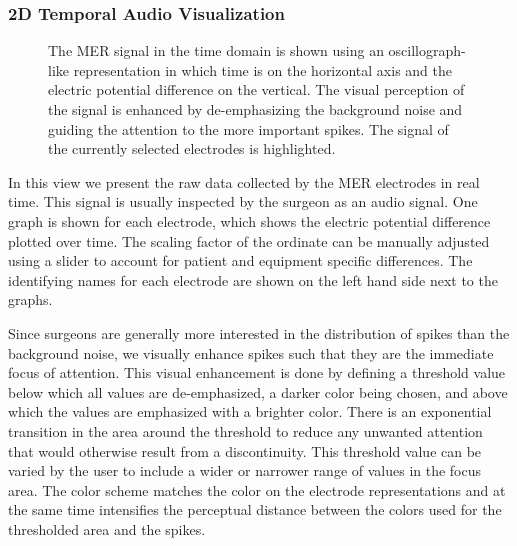 \documentclass{vgtc}                          %
\begin{document}
\subsubsection{2D Temporal Audio Visualization}\label{sec:overview:recording:mer}
\begin{figure}[b]
    \centering
    \caption{The MER signal in the time domain is shown using an oscillograph-like representation in which time is on the horizontal axis and the electric potential difference on the vertical. The visual perception of the signal is enhanced by de-emphasizing the background noise and guiding the attention to the more important spikes. The signal of the currently selected electrodes is highlighted.}
    \label{fig:recordingphase:sound}
\end{figure}

In this view we present the raw data collected by the MER electrodes in real time. This signal is usually inspected by the surgeon as an audio signal. One graph is shown for each electrode, which shows the electric potential difference plotted over time. The scaling factor of the ordinate can be manually adjusted using a slider to account for patient and equipment specific differences. The identifying names for each electrode are shown on the left hand side next to the graphs.

Since surgeons are generally more interested in the distribution of spikes than the background noise, we visually enhance spikes such that they are the immediate focus of attention. This visual enhancement is done by defining a threshold value below which all values are de-emphasized, a darker color being chosen, and above which the values are emphasized with a brighter color. There is an exponential transition in the area around the threshold to reduce any unwanted attention that would otherwise result from a discontinuity. This threshold value can be varied by the user to include a wider or narrower range of values in the focus area. The color scheme matches the color on the electrode representations and at the same time intensifies the perceptual distance between the colors used for the thresholded area and the spikes.
\end{document}
